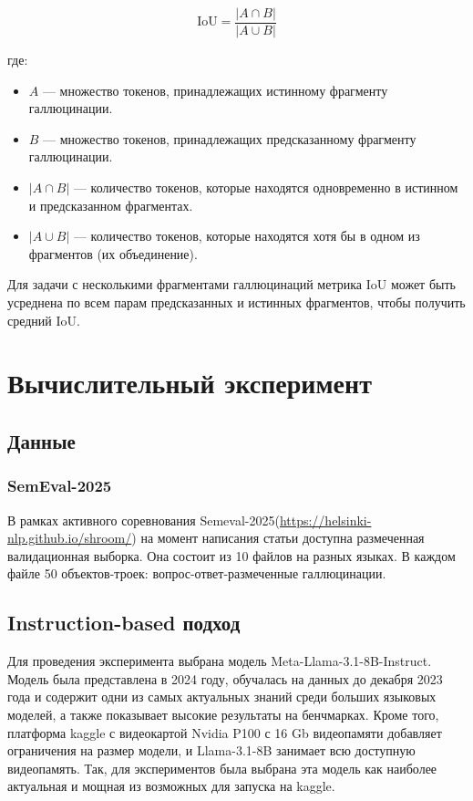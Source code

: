 \documentclass[12pt]{article}
\begin{document}
\[
\text{IoU} = \frac{|A \cap B|}{|A \cup B|}
\]

где:
\begin{itemize}
    \item \( A \) — множество токенов, принадлежащих истинному фрагменту галлюцинации.
    \item \( B \) — множество токенов, принадлежащих предсказанному фрагменту галлюцинации.
    \item \( |A \cap B| \) — количество токенов, которые находятся одновременно в истинном и предсказанном фрагментах.
    \item \( |A \cup B| \) — количество токенов, которые находятся хотя бы в одном из фрагментов (их объединение).
\end{itemize}

Для задачи с несколькими фрагментами галлюцинаций метрика IoU может быть усреднена по всем парам предсказанных и истинных фрагментов, чтобы получить средний IoU. 



\clearpage
\section{Вычислительный эксперимент}
\subsection{Данные}
\subsubsection{SemEval-2025}
В рамках активного соревнования Semeval-2025(\url{https://helsinki-nlp.github.io/shroom/}) на момент написания статьи доступна размеченная валидационная выборка. Она состоит из 10 файлов на разных языках. В каждом файле 50 объектов-троек: вопрос-ответ-размеченные галлюцинации.
\subsection{Instruction-based подход}
Для проведения эксперимента выбрана модель Meta-Llama-3.1-8B-Instruct. Модель была представлена в 2024 году, обучалась на данных до декабря 2023 года и содержит одни из самых актуальных знаний среди больших языковых моделей, а также показывает высокие результаты на бенчмарках. Кроме того, платформа kaggle с видеокартой Nvidia P100 с 16 Gb видеопамяти добавляет ограничения на размер модели, и Llama-3.1-8B занимает всю доступную видеопамять. Так, для экспериментов была выбрана эта модель как наиболее актуальная и мощная из возможных для запуска на kaggle.
\end{document}
